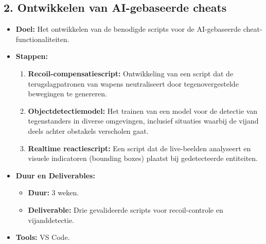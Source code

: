 \subsection{2. Ontwikkelen van AI-gebaseerde cheats}
\begin{itemize}
    \item \textbf{Doel:} Het ontwikkelen van de benodigde scripts voor de AI-gebaseerde cheat-functionaliteiten.
    \item \textbf{Stappen:}
    \begin{enumerate}
        \item \textbf{Recoil-compensatiescript:} Ontwikkeling van een script dat de terugslagpatronen van wapens neutraliseert door tegenovergestelde bewegingen te genereren.
        \item \textbf{Objectdetectiemodel:} Het trainen van een model voor de detectie van tegenstanders in diverse omgevingen, inclusief situaties waarbij de vijand deels achter obstakels verscholen gaat.
        \item \textbf{Realtime reactiescript:} Een script dat de live-beelden analyseert en visuele indicatoren (bounding boxes) plaatst bij gedetecteerde entiteiten.
    \end{enumerate}
    \item \textbf{Duur en Deliverables:}
    \begin{itemize}
        \item \textbf{Duur:} 3 weken.
        \item \textbf{Deliverable:} Drie gevalideerde scripts voor recoil-controle en vijanddetectie.
    \end{itemize}
    \item \textbf{Tools:} VS Code.
\end{itemize}


